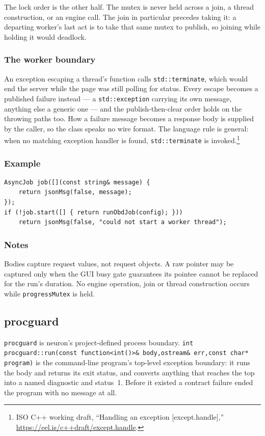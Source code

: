 The lock order is the other half.  The mutex is never held across a join, a
thread construction, or an engine call.  The join in particular precedes taking
it: a departing worker's last act is to take that same mutex to publish, so
joining while holding it would deadlock.

\subsubsection{The worker boundary}
An exception escaping a thread's function calls \texttt{std::terminate}, which
would end the server while the page was still polling for status.  Every escape
becomes a published failure instead --- a \texttt{std::exception} carrying its
own message, anything else a generic one --- and the publish-then-clear order
holds on the throwing paths too.  How a failure message becomes a response body
is supplied by the caller, so the class speaks no wire format.  The language
rule is general: when no matching exception handler is found,
\texttt{std::terminate} is invoked.\footnote{ISO C++ working draft, ``Handling
an exception [except.handle],'' \url{https://eel.is/c++draft/except.handle}.}

\subsubsection{Example}
\begin{verbatim}
AsyncJob job([](const string& message) {
    return jsonMsg(false, message);
});
if (!job.start([] { return runObdJob(config); }))
    return jsonMsg(false, "could not start a worker thread");
\end{verbatim}

\subsubsection{Notes}
Bodies capture request values, not request objects.  A raw pointer may be
captured only when the GUI busy gate guarantees its pointee cannot be replaced
for the run's duration.  No engine operation, join or thread construction occurs
while \texttt{progressMutex} is held.

\subsection{procguard}

\texttt{procguard} is neuron's project-defined process boundary.
\texttt{int procguard::run(const function<int()>\& body,ostream\& err,const
char* program)} is the command-line program's
top-level exception boundary: it runs the body and returns its exit status, and
converts anything that reaches the top into a named diagnostic and status~1.
Before it existed a contract failure ended the program with no message at all.

